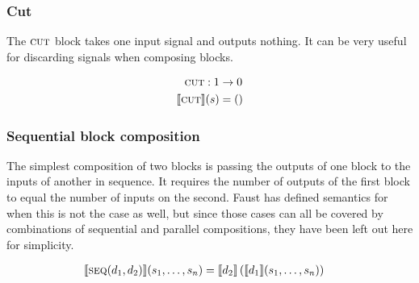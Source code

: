 \subsubsection{Cut}
The $\Cut$ block takes one input signal and outputs nothing. It can be very useful for
discarding signals when composing blocks.

\begin{minipage}{0.5\linewidth}
  \begin{align*}
    \Cut: 1        & \rightarrow 0 \\
    \SigP{\Cut}(s) & = ()
  \end{align*}
\end{minipage}
\begin{minipage}{0.5\linewidth}
  \begin{figure}[H]
    \centering
    \label{fig:block_cut}
    
  \end{figure}
\end{minipage}

\subsubsection{Sequential block composition}
\label{sec:block_seq}
The simplest composition of two blocks is passing the outputs of one block to the inputs of another in
sequence. It requires the number of outputs of the first block to equal the number of inputs on the second.
Faust has defined semantics for when this is not the case as well, but since those cases can all be covered
by combinations of sequential and parallel compositions, they have been left out here for simplicity.

\begin{minipage}{0.5\linewidth}
  \begin{prooftree}
  \end{prooftree}
  \begin{align*}
    \SigP{\Sequential(d_1, d_2)}(s_1, \dots, s_n)    ={} & \SigP{d_2}\left(\SigP{d_1}(s_1, \dots, s_n)\right)
  \end{align*}
\end{minipage}
\begin{minipage}{0.5\linewidth}
  \begin{figure}[H]
    \centering
    \label{fig:block_seq}
    
  \end{figure}
\end{minipage}

